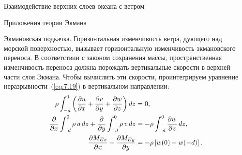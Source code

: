 \begin{chapter}{Взаимодействие верхних слоев океана с ветром}
\begin{section}{Приложения теории Экмана}
\begin{paragraph}{Экмановская подкачка.}
Горизонтальная изменчивость ветра, дующего над
морской поверхностью, вызывает горизонтальную изменчивость экмановского
переноса. В соответствии с законом сохранения массы, пространственная
изменчивость переноса должна порождать вертикальные скорости в верхней части 
слоя Экмана. Чтобы вычислить эти скорости, проинтегрируем уравнение 
неразрывности~(\ref{eq:7.19}) в вертикальном направлении:
\begin{equation}
\begin{aligned}
  \rho\int_{-d}^0 
    \left( \frac{\partial{u}}{\partial{x}} +\frac{\partial{v}}{\partial{y}}
           +\frac{\partial{w}}{\partial{z}} \right) dz 
     &=0, \notag \\
  \frac{\partial}{\partial{x}}\int_{-d}^0 \rho\,u\,dz 
           +\frac{\partial}{\partial{y}}\int_{-d}^0\rho\,v\,dz
     &=- \rho \int_{-d}^0 \frac{\partial{w}}{\partial{z}}\, dz, \notag \\
  \frac{\partial{M_{Ex}}}{\partial{x}}+\frac{\partial{M_{Ey}}}{\partial{y}} 
     &=-\rho \left[ w(0)-w(-d)\right].
\end{aligned}
\end{equation}
%


\end{paragraph}
\end{section}
\end{chapter}
